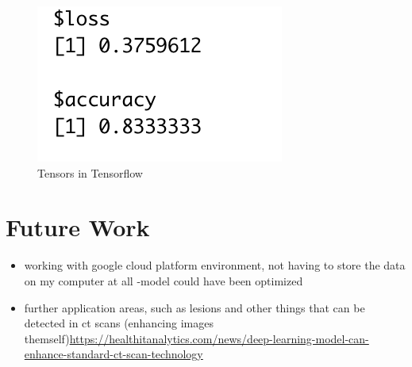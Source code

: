 \documentclass[12pt]{article}
\providecommand{\tightlist}{%
  \setlength{\itemsep}{0pt}\setlength{\parskip}{0pt}}
\begin{document}
\begin{figure}

{\centering \includegraphics[width=0.75\linewidth,height=0.25\textheight]{images/dd/acc} 

}

\caption{Tensors in Tensorflow}\label{fig:sample-fig9}
\end{figure}

\hypertarget{future-work}{%
\section{Future Work}\label{future-work}}

\begin{itemize}
\tightlist
\item
  working with google cloud platform environment, not having to store
  the data on my computer at all -model could have been optimized
\item
  further application areas, such as lesions and other things that can
  be detected in ct scans (enhancing images
  themself)\url{https://healthitanalytics.com/news/deep-learning-model-can-enhance-standard-ct-scan-technology}
\end{itemize}



\end{document}
